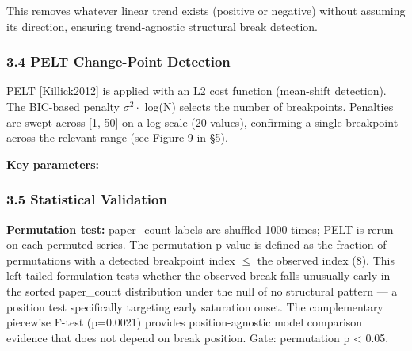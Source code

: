 This removes whatever linear trend exists (positive or negative) without assuming its direction, ensuring trend-agnostic structural break detection.

\subsubsection{3.4 PELT Change-Point Detection}

PELT [Killick2012] is applied with an L2 cost function (mean-shift detection). The BIC-based penalty $\sigma ^2 \cdot$ log(N) selects the number of breakpoints. Penalties are swept across [1, 50] on a log scale (20 values), confirming a single breakpoint across the relevant range (see Figure 9 in §5).

\textbf{Key parameters:}

\begin{table}[htbp]
\centering
{}
\end{table}

\subsubsection{3.5 Statistical Validation}

\textbf{Permutation test:} paper\_count labels are shuffled 1000 times; PELT is rerun on each permuted series. The permutation p-value is defined as the fraction of permutations with a detected breakpoint index $\leq$ the observed index (8). This left-tailed formulation tests whether the observed break falls unusually early in the sorted paper\_count distribution under the null of no structural pattern --- a position test specifically targeting early saturation onset. The complementary piecewise F-test (p=0.0021) provides position-agnostic model comparison evidence that does not depend on break position. Gate: permutation p < 0.05.

